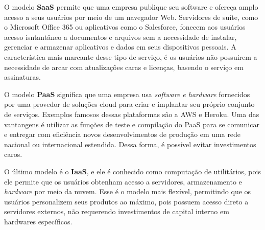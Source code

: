 \documentclass[12pt, a4paper]{paper}
\begin{document}
O modelo \textbf{SaaS} permite que uma empresa publique seu software e ofereça amplo
acesso a seus usuários por meio de um navegador Web. Servidores de suíte, 
como o Microsoft Office 365 ou aplicativos como o Salesforce, fonecem aos usuários 
acesso isntantâneo a documentos e arquivos sem a necessidade de instalar, gerenciar e 
armazenar aplicativos e dados em seus dispositivos pessoais. A característica mais 
marcante desse tipo de serviço, é os usuários não possuirem a necessidade de arcar 
com atualizações caras e licenças, basendo o serviço em assinaturas. 

O modelo \textbf{PaaS} significa que uma empresa usa \textit{software e hardware} 
fornecidos por uma provedor de soluções cloud para criar e implantar seu próprio 
conjunto de serviços. Exemplos famosos dessas plataformas são a AWS e Heroku. Uma das 
vantangens é utilizar as funções de teste e compilação do PaaS para se comunicar e 
entregar com eficiência novos desenvolvimentos de produção em uma rede nacional ou 
internacional estendida. Dessa forma, é possível evitar investimentos caros.

O último modelo é o \textbf{IaaS}, e ele é conhecido como computação de utilitários, 
pois ele permite que os usuários obtenham acesso a servidores, armazenamento e 
\textit{hardware} por meio da nuvem. Esse é o modelo mais flexível, permitindo que os 
usuários personalizem seus produtos ao máximo, pois possuem acesso direto a servidores 
externos, não requerendo investimentos de capital interno em hardwares específicos.
\end{document}
